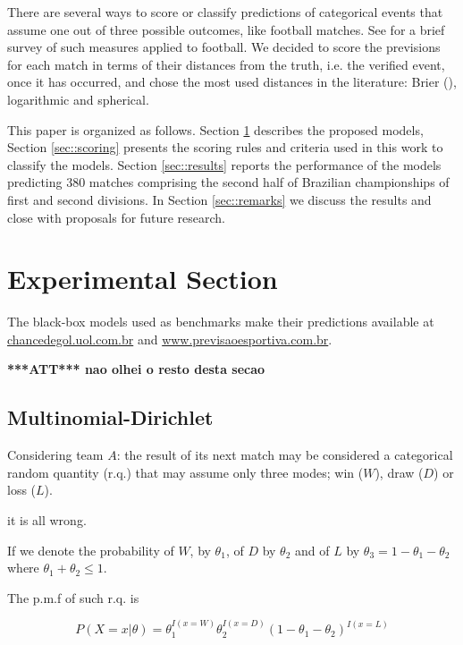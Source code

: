 \documentclass[journal,article,accept,moreauthors,pdftex,12pt,a4paper]{mdpi}
\newcommand{\red}[1]{\textbf{\color{red} ***ATT*** #1}}
\begin{document}
There are several ways to score or classify predictions of categorical events that assume one out of three possible outcomes, like football matches.
See \cite{constantinou} for a brief survey of such measures applied to football.
We decided to score the previsions for each match in terms of their distances from the truth, i.e. the verified event, once it has occurred, and chose the most used distances in the literature: Brier (\cite{brier1950}), logarithmic and spherical.

This paper is organized as follows.
Section \ref{sec::experimental} describes the proposed models, Section \ref{sec::scoring} presents the scoring rules and criteria used in this work to classify the models.
Section \ref{sec::results} reports the performance of the models predicting 380 matches comprising the second half of Brazilian championships of first and second divisions.
In Section \ref{sec::remarks} we discuss the results and close with proposals for future research.



\section{Experimental Section}
\label{sec::experimental}

The black-box models used as benchmarks make their predictions available at \url{chancedegol.uol.com.br} and \url{www.previsaoesportiva.com.br}.


\red{nao olhei o resto desta secao}

\subsection{Multinomial-Dirichlet}

Considering team $A$: the result of its next match may be considered a categorical random quantity (r.q.) that may assume only three modes; win ($W$), draw ($D$) or loss ($L$).

it is all wrong.

If we denote the probability of $W$, by $\theta_1$, of $D$ by $\theta_2$ and of $L$ by $\theta_3=1-\theta_1-\theta_2$ where $\theta_1+\theta_2\leq 1$.

The p.m.f of such r.q. is

\[
P(X=x|\theta)=\theta_1^{I(x=W)}\theta_2^{I(x=D)}(1-\theta_1-\theta_2)^{I(x=L)}
\]
\end{document}
